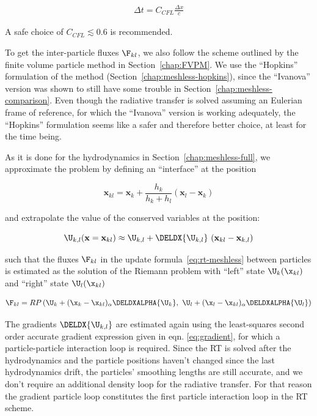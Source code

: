 \begin{align}
    \Delta t = C_{CFL} \frac{\Delta x}{c} \label{eq:rt-cfl}
\end{align}

A safe choice of $C_{CFL} \lesssim 0.6$ is recommended.



To get the inter-particle fluxes $\F_{kl}$, we also follow the scheme outlined by the finite volume
particle method in Section~\ref{chap:FVPM}. We use the ``Hopkins'' formulation of the method
(Section~\ref{chap:meshless-hopkins}), since the ``Ivanova'' version was shown to still have some
trouble in Section~\ref{chap:meshless-comparison}. Even though the radiative transfer is solved
assuming an Eulerian frame of reference, for which the ``Ivanova'' version is working adequately,
the ``Hopkins'' formulation seems like a safer and therefore better choice, at least for the time
being.

As it is done for the hydrodynamics in Section~\ref{chap:meshless-full}, we approximate the problem
by defining an ``interface'' at the position

\begin{equation}
	\mathbf{x}_{kl} = \mathbf{x}_k + \frac{h_k}{h_k + h_l} ( \mathbf{x}_l - \mathbf{x}_k )
\end{equation}

and extrapolate the value of the conserved variables at the position:

\begin{equation}
	\U_{k, l}(\mathbf{x} =
        \mathbf{x}_{kl}) \approx \U_{k, l} + \DELDX{ \U_{k, l}}\ (\mathbf{x}_{kl}
- \mathbf{x}_{k,l})
\end{equation}


such that the fluxes $\F_{kl}$ in the update formula~\ref{eq:rt-meshless} between particles is
estimated as the solution of the Riemann problem with ``left'' state $\U_k(\x_{kl})$ and ``right''
state $\U_l(\x_{kl})$

\begin{align}
    \F_{kl}
    = RP
    \left(\U_k + (\x_{k} - \x_{kl})_\alpha \DELDXALPHA{\U_k}, \
    \U_l + (\x_{l} - \x_{kl})_\alpha \DELDXALPHA{\U_l} \right) \label{eq:rt-riemann-problem}
\end{align}


The gradients $\DELDX{\U_{k,l}}$ are estimated again using the least-squares second order accurate
gradient expression given in eqn. \ref{eq:gradient}, for which a particle-particle interaction loop
is required. Since the RT is solved after the hydrodynamics and the particle positions haven't
changed since the last hydrodynamics drift, the particles' smoothing lengths are still accurate, and
we don't require an additional density loop for the radiative transfer. For that reason the gradient
particle loop constitutes the first particle interaction loop in the RT scheme.





